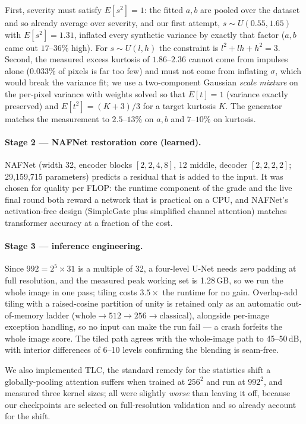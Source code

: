 First, severity must satisfy $E[s^2]=1$: the fitted $a,b$ are pooled over the dataset and
so already average over severity, and our first attempt, $s\sim U(0.55,1.65)$ with
$E[s^2]=1.31$, inflated every synthetic variance by exactly that factor ($a,b$ came out
$17$--$36\%$ high). For $s\sim U(l,h)$ the constraint is $l^2+lh+h^2=3$. Second, the
measured excess kurtosis of $1.86$--$2.36$ cannot come from impulses alone ($0.033\%$ of
pixels is far too few) and must not come from inflating $\sigma$, which would break the
variance fit; we use a two-component Gaussian \emph{scale mixture} on the per-pixel
variance with weights solved so that $E[t]=1$ (variance exactly preserved) and
$E[t^2]=(K+3)/3$ for a target kurtosis $K$. The generator matches the measurement to
$2.5$--$13\%$ on $a,b$ and $7$--$10\%$ on kurtosis.

\paragraph{Stage 2 --- NAFNet restoration core (learned).}
NAFNet (width 32, encoder blocks $[2,2,4,8]$, 12 middle, decoder $[2,2,2,2]$;
29{,}159{,}715 parameters) predicts a residual that is added to the input. It was chosen
for quality per FLOP: the runtime component of the grade and the live final round both
reward a network that is practical on a CPU, and NAFNet's activation-free design
(SimpleGate plus simplified channel attention) matches transformer accuracy at a
fraction of the cost.

\paragraph{Stage 3 --- inference engineering.}
Since $992=2^5\times31$ is a multiple of 32, a four-level U-Net needs \emph{zero} padding
at full resolution, and the measured peak working set is 1.28\,GB, so we run the whole
image in one pass; tiling costs $3.5\times$ the runtime for no gain. Overlap-add tiling
with a raised-cosine partition of unity is retained only as an automatic out-of-memory
ladder ($\text{whole}\to512\to256\to\text{classical}$), alongside per-image exception
handling, so no input can make the run fail --- a crash forfeits the whole image score.
The tiled path agrees with the whole-image path to 45--50\,dB, with interior differences
of 6--10 levels confirming the blending is seam-free.

We also implemented TLC, the standard remedy for the statistics shift a globally-pooling
attention suffers when trained at $256^2$ and run at $992^2$, and measured three kernel
sizes; all were slightly \emph{worse} than leaving it off, because our checkpoints are
selected on full-resolution validation and so already account for the shift.

